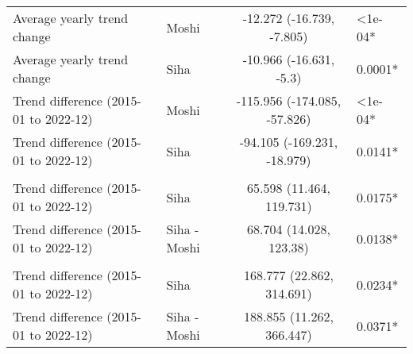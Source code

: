 \begin{longtable}{l|lcl}
\midrule\addlinespace[2.5pt]
\multicolumn{4}{l}{Malnutrition} \\[2.5pt] 
\midrule\addlinespace[2.5pt]
Average yearly trend change & Moshi & -12.272 (-16.739, -7.805) & <1e-04* \\ 
Average yearly trend change & Siha & -10.966 (-16.631, -5.3) & 0.0001* \\ 
Trend difference (2015-01 to 2022-12) & Moshi & -115.956 (-174.085, -57.826) & <1e-04* \\ 
Trend difference (2015-01 to 2022-12) & Siha & -94.105 (-169.231, -18.979) & 0.0141* \\ 
\midrule\addlinespace[2.5pt]
\multicolumn{4}{l}{Cancer} \\[2.5pt] 
\midrule\addlinespace[2.5pt]
Trend difference (2015-01 to 2022-12) & Siha & 65.598 (11.464, 119.731) & 0.0175* \\ 
Trend difference (2015-01 to 2022-12) & Siha - Moshi & 68.704 (14.028, 123.38) & 0.0138* \\ 
\midrule\addlinespace[2.5pt]
\multicolumn{4}{l}{Other Non-Communicable} \\[2.5pt] 
\midrule\addlinespace[2.5pt]
Trend difference (2015-01 to 2022-12) & Siha & 168.777 (22.862, 314.691) & 0.0234* \\ 
Trend difference (2015-01 to 2022-12) & Siha - Moshi & 188.855 (11.262, 366.447) & 0.0371* \\ 
\bottomrule
\end{longtable}
\endgroup

